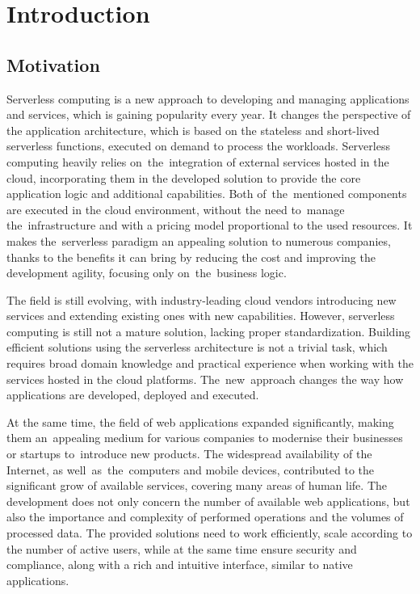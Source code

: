 \chapter{Introduction}

\section{Motivation}

Serverless computing is a new approach to developing and managing applications and services, which is gaining popularity every year.
It changes the perspective of the application architecture, which is based on the stateless and short-lived serverless functions, executed on demand to process the workloads.
Serverless computing heavily relies on~the~integration of external services hosted in the cloud, incorporating them in the developed solution to provide the core application logic and additional capabilities.
Both of~the~mentioned components are executed in the cloud environment, without the need to~manage the~infrastructure and with a pricing model proportional to the used resources.
It makes the~serverless paradigm an appealing solution to numerous companies, thanks to the benefits it can bring by reducing the cost and improving the development agility, focusing only on~the~business logic.

The field is still evolving, with industry-leading cloud vendors introducing new services and extending existing ones with new capabilities.
However, serverless computing is still not a mature solution, lacking proper standardization.
Building efficient solutions using the serverless architecture is not a trivial task, which requires broad domain knowledge and practical experience when working with the services hosted in the cloud platforms.
The~new~approach changes the way how applications are developed, deployed and executed.

At the same time, the field of web applications expanded significantly, making them an~appealing medium for various companies to modernise their businesses or startups to~introduce new products.
The widespread availability of the Internet, as well~as~the~computers and mobile devices, contributed to the significant grow of available services, covering many areas of human life.
The development does not only concern the number of available web applications, but also the importance and complexity of performed operations and the volumes of processed data.
The provided solutions need to work efficiently, scale according to the number of active users, while at the same time ensure security and compliance, along with a rich and intuitive interface, similar to native applications.


